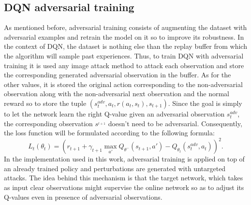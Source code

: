 \subsection{DQN adversarial training}
As mentioned before, adversarial training consists of augmenting the dataset with adversarial examples and retrain the model on it so to improve its robustness. In the context of DQN, the dataset is nothing else than the replay buffer from which the algorithm will sample past experiences. Thus, to train DQN with adversarial training it is used any image attack method to attack each observation and store the corresponding generated adversarial observation in the buffer. As for the other values, it is stored the original action corresponding to the non-adversarial observation along with the non-adversarial next observation and the normal reward so to store the tuple \((s^{adv}_t, a_t, r(a_t,s_t), s_{t+1})\). Since the goal is simply to let the network learn the right Q-value given an adversarial observation \(s^{adv}_t\), the corresponding observation \(s^_{t+1}\) doesn't need to be adversarial. Consequently, the loss function will be formulated according to the following formula:
\begin{equation} \label{equation:advDQN}
L_t(\theta_t)=(r_{t+1}+\gamma_{t+1}\max_{a'}Q_{\theta^{-}}(s_{t+1},a')-Q_{\theta_t}(s^{adv}_t,a_t))^2.
\end{equation}
In the implementation used in this work, adversarial training is applied on top of an already trained policy and perturbations are generated with untargeted attacks. The idea behind this mechanism is that the target network, which takes as input clear observations might supervise the online network so as to adjust its Q-values even in presence of adversarial observations.

